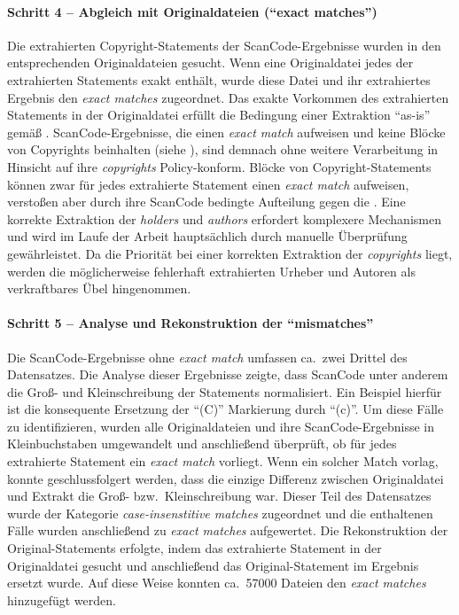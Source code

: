 \paragraph{Schritt 4 -- Abgleich mit Originaldateien (\enquote{exact matches})}
Die extrahierten Copyright-Statements der ScanCode-Ergebnisse wurden in den entsprechenden Originaldateien gesucht.
Wenn eine Originaldatei jedes der extrahierten Statements exakt enthält, wurde diese Datei und ihr extrahiertes Ergebnis den \textit{exact matches} zugeordnet.
Das exakte Vorkommen des extrahierten Statements in der Originaldatei erfüllt die Bedingung einer Extraktion \enquote{as-is} gemäß .
ScanCode-Ergebnisse, die einen \textit{exact match} aufweisen und keine Blöcke von Copyrights beinhalten (siehe ), sind demnach ohne weitere Verarbeitung in Hinsicht auf ihre \textit{copyrights} Policy-konform.
Blöcke von Copyright-Statements können zwar für jedes extrahierte Statement einen \textit{exact match} aufweisen, verstoßen aber durch ihre ScanCode bedingte Aufteilung gegen die .
Eine korrekte Extraktion der \textit{holders} und \textit{authors} erfordert komplexere Mechanismen und wird im Laufe der Arbeit hauptsächlich durch manuelle Überprüfung gewährleistet.
Da die Priorität bei einer korrekten Extraktion der \textit{copyrights} liegt, werden die möglicherweise fehlerhaft extrahierten Urheber und Autoren als verkraftbares Übel hingenommen.

\paragraph{Schritt 5 -- Analyse und Rekonstruktion der \enquote{mismatches}}
Die ScanCode-Ergebnisse ohne \textit{exact match} umfassen ca.\ zwei Drittel des Datensatzes.
Die Analyse dieser Ergebnisse zeigte, dass ScanCode unter anderem die Groß- und Kleinschreibung der Statements normalisiert.
Ein Beispiel hierfür ist die konsequente Ersetzung der \enquote{(C)} Markierung durch \enquote{(c)}.
Um diese Fälle zu identifizieren, wurden alle Originaldateien und ihre ScanCode-Ergebnisse in Kleinbuchstaben umgewandelt und anschließend überprüft, ob für jedes extrahierte Statement ein \textit{exact match} vorliegt.
Wenn ein solcher Match vorlag, konnte geschlussfolgert werden, dass die einzige Differenz zwischen Originaldatei und Extrakt die Groß- bzw.\ Kleinschreibung war.
Dieser Teil des Datensatzes wurde der Kategorie \textit{case-insenstitive matches} zugeordnet und die enthaltenen Fälle wurden anschließend zu \textit{exact matches} aufgewertet.
Die Rekonstruktion der Original-Statements erfolgte, indem das extrahierte Statement in der Originaldatei gesucht und anschließend das Original-Statement im Ergebnis ersetzt wurde.
Auf diese Weise konnten ca.\ \num{57000} Dateien den \textit{exact matches} hinzugefügt werden.

